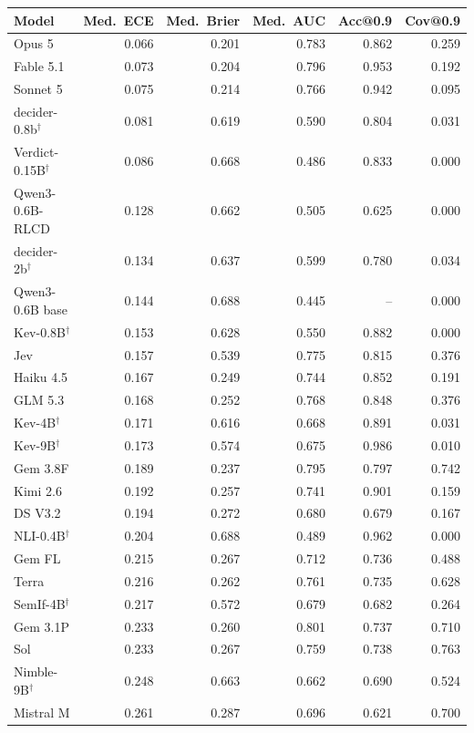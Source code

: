\begin{tabular}{lrrrrr}
\toprule
Model & Med.\ ECE & Med.\ Brier & Med.\ AUC & Acc@0.9 & Cov@0.9 \\
\midrule
Opus 5 & 0.066 & 0.201 & 0.783 & 0.862 & 0.259 \\
Fable 5.1 & 0.073 & 0.204 & 0.796 & 0.953 & 0.192 \\
Sonnet 5 & 0.075 & 0.214 & 0.766 & 0.942 & 0.095 \\
decider-0.8b$^{\dagger}$ & 0.081 & 0.619 & 0.590 & 0.804 & 0.031 \\
Verdict-0.15B$^{\dagger}$ & 0.086 & 0.668 & 0.486 & 0.833 & 0.000 \\
Qwen3-0.6B-RLCD & 0.128 & 0.662 & 0.505 & 0.625 & 0.000 \\
decider-2b$^{\dagger}$ & 0.134 & 0.637 & 0.599 & 0.780 & 0.034 \\
Qwen3-0.6B base & 0.144 & 0.688 & 0.445 & -- & 0.000 \\
Kev-0.8B$^{\dagger}$ & 0.153 & 0.628 & 0.550 & 0.882 & 0.000 \\
Jev & 0.157 & 0.539 & 0.775 & 0.815 & 0.376 \\
Haiku 4.5 & 0.167 & 0.249 & 0.744 & 0.852 & 0.191 \\
GLM 5.3 & 0.168 & 0.252 & 0.768 & 0.848 & 0.376 \\
Kev-4B$^{\dagger}$ & 0.171 & 0.616 & 0.668 & 0.891 & 0.031 \\
Kev-9B$^{\dagger}$ & 0.173 & 0.574 & 0.675 & 0.986 & 0.010 \\
Gem 3.8F & 0.189 & 0.237 & 0.795 & 0.797 & 0.742 \\
Kimi 2.6 & 0.192 & 0.257 & 0.741 & 0.901 & 0.159 \\
DS V3.2 & 0.194 & 0.272 & 0.680 & 0.679 & 0.167 \\
NLI-0.4B$^{\dagger}$ & 0.204 & 0.688 & 0.489 & 0.962 & 0.000 \\
Gem FL & 0.215 & 0.267 & 0.712 & 0.736 & 0.488 \\
Terra & 0.216 & 0.262 & 0.761 & 0.735 & 0.628 \\
SemIf-4B$^{\dagger}$ & 0.217 & 0.572 & 0.679 & 0.682 & 0.264 \\
Gem 3.1P & 0.233 & 0.260 & 0.801 & 0.737 & 0.710 \\
Sol & 0.233 & 0.267 & 0.759 & 0.738 & 0.763 \\
Nimble-9B$^{\dagger}$ & 0.248 & 0.663 & 0.662 & 0.690 & 0.524 \\
Mistral M & 0.261 & 0.287 & 0.696 & 0.621 & 0.700 \\

\end{tabular}

